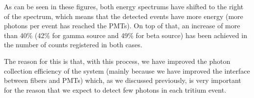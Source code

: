 As can be seen in these figures, both energy spectrums have shifted to the right of the spectrum, which means that the detected events have more energy (more photons per event has reached the PMTs). On top of that, an increase of more than 40\% (42\% for gamma source and 49\% for beta source) has been achieved in the number of counts registered in both cases.

The reason for this is that, with this process, we have improved the photon collection efficiency of the system (mainly because we have improved the interface between fibers and PMTs) which, as we discussed previously, is very important for the reason that we expect to detect few photons in each tritium event.